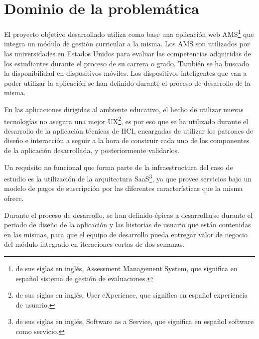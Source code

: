 \section{Dominio de la problemática}
El proyecto objetivo desarrollado utiliza como base una aplicación web AMS\footnote{de sus siglas en inglés, Assessment Management System, que significa en español sistema de gestión de evaluaciones.} que integra un módulo de gestión curricular a la misma. Los AMS son utilizados por las universidades en Estados Unidos para evaluar las competencias adquiridas de los estudiantes durante el proceso de su carrera o grado. También se ha buscado la disponibilidad en dispositivos móviles. Los dispositivos inteligentes que van a poder utilizar la aplicación se han definido durante el proceso de desarrollo de la misma.

En las aplicaciones dirigidas al ambiente educativo, el hecho de utilizar nuevas tecnologías no asegura una mejor UX\footnote{de sus siglas en inglés, User eXperience, que significa en español experiencia de usuario.}, es por eso que se ha utilizado durante el desarrollo de la aplicación técnicas de HCI\citep{lazar_research_2010}, encargadas de utilizar los patrones de diseño e interacción a seguir a la hora de construir cada uno de los componentes de la aplicación desarrollada, y posteriormente validarlos.

Un requisito no funcional que forma parte de la infraestructura del caso de estudio es la utilización de la arquitectura SaaS\footnote{de sus siglas en inglés, Software as a Service, que significa en español software como servicio.}, ya que provee servicios bajo un modelo de pagos de suscripción por las diferentes características que la misma ofrece.

Durante el proceso de desarrollo, se han definido épicas a desarrollarse durante el periodo de diseño de la aplicación y las historias de usuario que están contenidas en las mismas, para que el equipo de desarrollo pueda entregar valor de negocio del módulo integrado en iteraciones cortas de dos semanas.